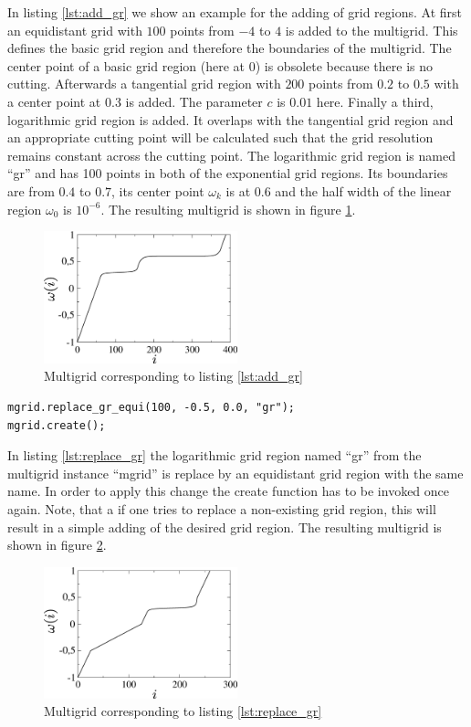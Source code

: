 In listing \ref{lst:add_gr} we show an example for the adding of grid regions. At first an equidistant grid with $100$ points from $-4$ to $4$ is added to the multigrid. This defines the basic grid region and therefore the boundaries of the multigrid. The center point of a basic grid region (here at $0$) is obsolete because there is no cutting. Afterwards a tangential grid region with $200$ points from $0.2$ to $0.5$ with a center point at $0.3$ is added. The parameter $c$ is $0.01$ here. Finally a third, logarithmic grid region is added. It overlaps with the tangential grid region and an appropriate cutting point will be calculated such that the grid resolution remains constant across the cutting point. The logarithmic grid region is named   ``gr'' and has 100 points in both of the exponential grid regions. Its boundaries are from $0.4$ to $0.7$, its center point $\omega_k$ is at $0.6$ and the half width of the linear region $\omega_0$ is $10^{-6}$. The resulting multigrid is shown in figure \ref{fig:example_add_gr}.
\begin{figure}[h]
	\centering
	\includegraphics[width=0.5\textwidth]{pics/example_add_gr.eps}
	\caption{Multigrid corresponding to listing \ref{lst:add_gr}}
	\label{fig:example_add_gr}
\end{figure}

\begin{lstlisting}[caption={Example for replacing a grid region},label={lst:replace_gr}]
mgrid.replace_gr_equi(100, -0.5, 0.0, "gr");
mgrid.create();
\end{lstlisting}

In listing \ref{lst:replace_gr} the logarithmic grid region named ``gr'' from the multigrid instance ``mgrid'' is replace by an equidistant grid region with the same name. In order to apply this change the create function has to be invoked once again. Note, that a if one tries to replace a non-existing grid region, this will result in a simple adding of the desired grid region. The resulting multigrid is shown in figure \ref{fig:example_replace_gr}.
\begin{figure}[h]
	\centering
	\includegraphics[width=0.5\textwidth]{pics/example_replace_gr.eps}
	\caption{Multigrid corresponding to listing \ref{lst:replace_gr}}
	\label{fig:example_replace_gr}
\end{figure}

